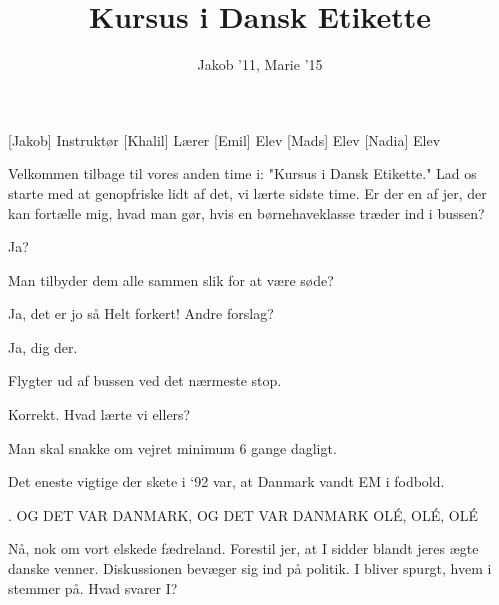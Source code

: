\documentclass[a4paper,11pt]{article}
\title{Kursus i Dansk Etikette}
\author{Jakob '11, Marie '15}
\begin{document}
\maketitle

\begin{roles}
[Jakob] Instruktør
[Khalil] Lærer 
[Emil] Elev 
[Mads] Elev
[Nadia] Elev 
\end{roles}

\begin{props}
\end{props}


\begin{sketch}


 Velkommen tilbage til vores anden time i: "Kursus i Dansk Etikette."
Lad os starte med at genopfriske lidt af det, vi lærte sidste time. Er der en af jer,
der kan fortælle mig, hvad man gør, hvis en børnehaveklasse træder ind i bussen?


  Ja?

 Man tilbyder dem alle sammen slik for at være søde?

 Ja, det er jo så %
 Helt forkert! %
Andre forslag?


 Ja,  dig der. 

  Flygter ud af bussen ved det nærmeste stop.

  Korrekt. Hvad lærte vi ellers?

  Man skal snakke om vejret minimum 6 gange dagligt.

  Det eneste vigtige der skete i ‘92 var, at Danmark vandt EM i fodbold.

 . OG DET VAR DANMARK,
OG DET VAR DANMARK  OLÉ, OLÉ, OLÉ


 Nå, nok om vort elskede fædreland.
Forestil jer, at I sidder blandt jeres ægte danske venner. Diskussionen bevæger sig ind på politik.
I bliver spurgt, hvem i stemmer på. %
Hvad svarer I?


\end{sketch}
\end{document}
